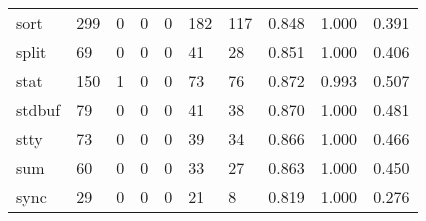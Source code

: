 \begin{longtable}{lp{2.0cm}p{2.0cm}p{2.0cm}p{2.0cm}p{2.0cm}p{2.0cm}p{2.0cm}p{2.0cm}p{2.0cm}}
sort      &                    299 &                                             0 &                                            0 &                                           0 &                                          182 &                                        117 &                                0.848 &                                  1.000 &                                0.391 \\
split     &                     69 &                                             0 &                                            0 &                                           0 &                                           41 &                                         28 &                                0.851 &                                  1.000 &                                0.406 \\
stat      &                    150 &                                             1 &                                            0 &                                           0 &                                           73 &                                         76 &                                0.872 &                                  0.993 &                                0.507 \\
stdbuf    &                     79 &                                             0 &                                            0 &                                           0 &                                           41 &                                         38 &                                0.870 &                                  1.000 &                                0.481 \\
stty      &                     73 &                                             0 &                                            0 &                                           0 &                                           39 &                                         34 &                                0.866 &                                  1.000 &                                0.466 \\
sum       &                     60 &                                             0 &                                            0 &                                           0 &                                           33 &                                         27 &                                0.863 &                                  1.000 &                                0.450 \\
sync      &                     29 &                                             0 &                                            0 &                                           0 &                                           21 &                                          8 &                                0.819 &                                  1.000 &                                0.276 \\

\end{longtable}
